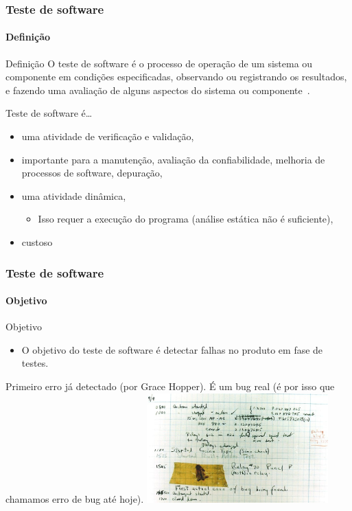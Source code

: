 \begin{frame}[hasprev=true, hasnext=true]
\frametitle{Teste de software}
\framesubtitle{Definição}
\label{concept:software-testing}

\begin{block:concept}{Definição}
O teste de software é o processo de operação de um sistema ou componente em condições especificadas, observando ou registrando os resultados, e fazendo uma avaliação de alguns aspectos do sistema ou componente~\cite{ieee610.12:1990}.
\end{block:concept}

\begin{block:fact}{Teste de software é\dots{}}
\begin{itemize}
	\item uma atividade de verificação e validação,

	\item importante para a manutenção, avaliação da confiabilidade, melhoria de processos de software, depuração,

	\item uma atividade dinâmica,
	\begin{itemize}
		\item Isso requer a execução do programa (análise estática não é suficiente),
	\end{itemize}

	\item custoso~\cite{harrold:2000}
\end{itemize}
\end{block:fact}
\end{frame}



\begin{frame}
\frametitle{Teste de software}
\framesubtitle{Objetivo}

\begin{block:fact}{Objetivo}
\begin{itemize}
	\item O objetivo do teste de software é detectar falhas no produto em fase de testes.
\end{itemize}
\end{block:fact}

\begin{block:fact}{}
Primeiro erro já detectado (por Grace Hopper). É um bug real (é por isso que chamamos erro de bug até hoje).
\centering
\includegraphics[width=7cm]{teste-de-software/conceitos-basicos/Imagens/first-bug}
\end{block:fact}
\end{frame}



